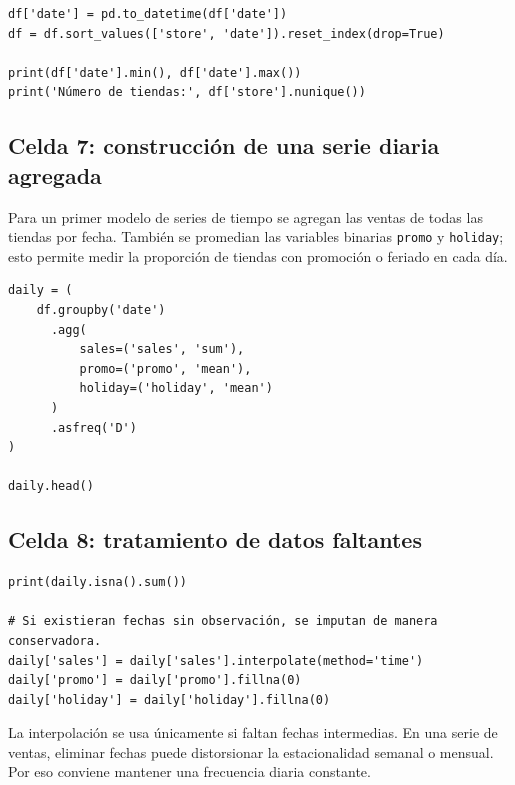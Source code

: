 \documentclass[11pt,letterpaper]{article}
\newcommand{\code}[1]{\texttt{#1}}
\begin{document}
\begin{lstlisting}[style=pythoncolab]
df['date'] = pd.to_datetime(df['date'])
df = df.sort_values(['store', 'date']).reset_index(drop=True)

print(df['date'].min(), df['date'].max())
print('Número de tiendas:', df['store'].nunique())
\end{lstlisting}

\subsection{Celda 7: construcción de una serie diaria agregada}

\begin{markdowncell}
Para un primer modelo de series de tiempo se agregan las ventas de todas las tiendas por fecha. También se promedian las variables binarias \code{promo} y \code{holiday}; esto permite medir la proporción de tiendas con promoción o feriado en cada día.
\end{markdowncell}

\begin{lstlisting}[style=pythoncolab]
daily = (
    df.groupby('date')
      .agg(
          sales=('sales', 'sum'),
          promo=('promo', 'mean'),
          holiday=('holiday', 'mean')
      )
      .asfreq('D')
)

daily.head()
\end{lstlisting}

\subsection{Celda 8: tratamiento de datos faltantes}

\begin{lstlisting}[style=pythoncolab]
print(daily.isna().sum())

# Si existieran fechas sin observación, se imputan de manera conservadora.
daily['sales'] = daily['sales'].interpolate(method='time')
daily['promo'] = daily['promo'].fillna(0)
daily['holiday'] = daily['holiday'].fillna(0)
\end{lstlisting}

\begin{interpretacion}
La interpolación se usa únicamente si faltan fechas intermedias. En una serie de ventas, eliminar fechas puede distorsionar la estacionalidad semanal o mensual. Por eso conviene mantener una frecuencia diaria constante.
\end{interpretacion}
\end{document}
